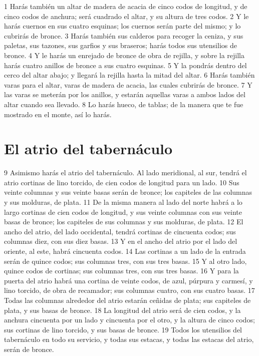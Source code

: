 1 Harás también un altar de madera de acacia de cinco codos   de longitud, y de cinco codos de anchura; será cuadrado el altar, y su altura de tres codos.
2 Y le harás cuernos en sus cuatro esquinas; los cuernos serán parte del mismo; y lo cubrirás de bronce.
3 Harás también sus calderos para recoger la ceniza, y sus paletas, sus tazones, sus garfios y sus braseros; harás todos sus utensilios de bronce.
4 Y le harás un enrejado de bronce de obra de rejilla, y sobre la rejilla harás cuatro anillos de bronce a sus cuatro esquinas.
5 Y la pondrás dentro del cerco del altar abajo; y llegará la rejilla hasta la mitad del altar.
6 Harás también varas para el altar, varas de madera de acacia, las cuales cubrirás de bronce.
7 Y las varas se meterán por los anillos, y estarán aquellas varas a ambos lados del altar cuando sea llevado.
8 Lo harás hueco, de tablas; de la manera que te fue mostrado en el monte, así lo harás.

\section{El atrio del tabernáculo}

9 Asimismo harás el atrio del tabernáculo. Al lado meridional, al sur, tendrá el atrio cortinas de lino torcido, de cien codos   de longitud para un lado.
10 Sus veinte columnas y sus veinte basas serán de bronce; los capiteles de las columnas y sus molduras, de plata.
11 De la misma manera al lado del norte habrá a lo largo cortinas de cien codos   de longitud, y sus veinte columnas con sus veinte basas de bronce; los capiteles de sus columnas y sus molduras, de plata.
12 El ancho del atrio, del lado occidental, tendrá cortinas de cincuenta codos; sus columnas diez, con sus diez basas.
13 Y en el ancho del atrio por el lado del oriente, al este, habrá cincuenta codos.
14 Las cortinas a un lado de la entrada serán de quince codos;  sus columnas tres, con sus tres basas.
15 Y al otro lado, quince codos   de cortinas; sus columnas tres, con sus tres basas.
16 Y para la puerta del atrio habrá una cortina de veinte codos, de azul, púrpura y carmesí, y lino torcido, de obra de recamador; sus columnas cuatro, con sus cuatro basas.
17 Todas las columnas alrededor del atrio estarán ceñidas de plata; sus capiteles de plata, y sus basas de bronce.
18 La longitud del atrio será de cien codos,  y la anchura cincuenta por un lado y cincuenta por el otro, y la altura de cinco codos; sus cortinas de lino torcido, y sus basas de bronce.
19 Todos los utensilios del tabernáculo en todo su servicio, y todas sus estacas, y todas las estacas del atrio, serán de bronce.

